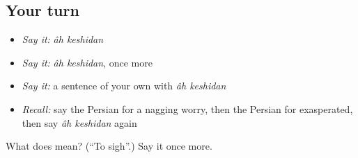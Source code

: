 \subsection*{Your turn}
\begin{itemize}
\raggedright
  \item \emph{Say it:} \emph{âh keshidan}
  \item \emph{Say it:} \emph{âh keshidan}, once more
  \item \emph{Say it:} a sentence of your own with \emph{âh keshidan}
  \item \emph{Recall:} say the Persian for a nagging worry, then the Persian for exasperated, then say \emph{âh keshidan} again
\end{itemize}

\begin{tcolorbox}[breakable,colback=teal!4,colframe=teal!35!black,title={Before you move on}]
What does   mean? (\textquotedblleft{}To sigh\textquotedblright{}.) Say it once more.
\end{tcolorbox}
